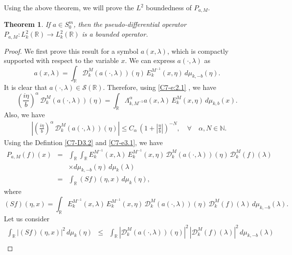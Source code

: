 \documentclass[12pt,a4paper,reqno]{amsproc}
\newtheorem{theorem}{Theorem}[section]
\theoremstyle{definition}
\theoremstyle{remark}
\numberwithin{equation}{section}
\begin{document}
 Using the above theorem, we will prove the $L^2$ boundedness of $P_{a,M}$.
 \begin{theorem}  If $a\in S^m_0$, then the pseudo-differential operator 
 $P_{a,M}:L^2_k(\mathbb{R}) \to L^2_k(\mathbb{R})$ is a bounded operator.
\end{theorem}
\begin{proof}
We first prove this result for a symbol $a(x,\lambda)$, which is compactly supported with respect to the variable $x$. We can express $a(\cdot,\lambda)$ as
\begin{equation} \label{C7-e3.1}
 a(x,\lambda) = \int_{\mathbb{R}} \mathcal{D}_k^M(a(\cdot, \lambda))(\eta)\, E_k^{M^{-1}}(x,\eta)\, d\mu_{k,-b}(\eta).
\end{equation}
It is clear that  $a(\cdot, \lambda) \in \mathcal{S}(\mathbb{R})$. Therefore, using \eqref{C7-e:2.1} , we have 
\begin{equation*}
    \left(\frac{i\eta}{b}\right)^\alpha\, \mathcal{D}_k^M(a(\cdot, \lambda))(\eta) = \int_{\mathbb{R}} \Lambda^\alpha_{k,M^{-1}} a(x,\lambda)\,E_k^M(x,\eta)\,d\mu_{k,b}(x).
\end{equation*}
Also, we have 
\begin{eqnarray*}
 \mathop{\underset{\eta
 \in \mathbb{R}}{\text{sup}}}  \left|  \left(\frac{i\eta}{b}\right)^\alpha\, \mathcal{D}_k^M(a(\cdot, \lambda))(\eta) \right| \le C_\alpha\,\left(1+ \left|\frac{\eta}{b} \right|\right)^{-N}, \quad \forall \quad 
\alpha,  N \in \mathbb{N}.
\end{eqnarray*}
Using the Defintion \ref{C7-D3.2} and \eqref{C7-e3.1}, we have 
\begin{eqnarray*}
    P_{a,M}(f)(x) &=& \int_{\mathbb{R}} \int_{\mathbb{R}} E_k^{M^{-1}}(x,\lambda)\,E_k^{M^{-1}}(x,\eta)\,\mathcal{D}_k^M(a(\cdot,\lambda))(\eta)\,\mathcal{D}_k^M(f)(\lambda)\,\\ &&\times d\mu_{k,-b}(\eta)\, d\mu_k(\lambda)\\
    &=&\int_{\mathbb{R}}  (Sf)(\eta,x)\,d\mu_k(\eta),
\end{eqnarray*}
where
\begin{equation*}
(Sf)(\eta,x) = \int_{\mathbb{R}} E_k^{M^{-1}}(x,\lambda)\,E_k^{M^{-1}}(x,\eta)\,\mathcal{D}_k^M(a(\cdot,\lambda))(\eta)\,\mathcal{D}_k^M(f)(\lambda)\,d\mu_{k,-b}(\lambda).
\end{equation*}
Let us consider
\begin{eqnarray*}
    \int_{\mathbb{R}} |(Sf)(\eta,x)|^2\,d\mu_k(\eta) &\le&\int_{\mathbb{R}} |\mathcal{D}_k^M(a(\cdot,\lambda))(\eta)|^2\,|\mathcal{D}_k^M(f)(\lambda)|^2\,d\mu_{k,-b}(\lambda)\\

\end{eqnarray*}
\end{proof}
\end{document}
